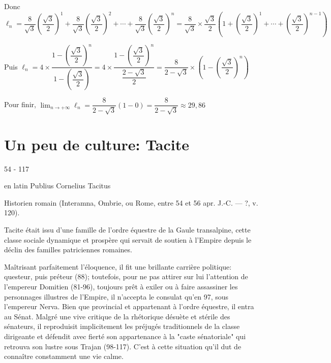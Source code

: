 \documentclass{cornouaille}
\begin{document}
\begin{exercice}
\begin{enumerate}
\begin{enumerate}
\begin{solution}
Donc $\ell_n=\dfrac{8}{\sqrt{3}} \left( \dfrac{\sqrt{3}}{2} \right)^1 + \dfrac{8}{\sqrt{3}} \left( \dfrac{\sqrt{3}}{2} \right)^2 + \cdots + \dfrac{8}{\sqrt{3}} \left( \dfrac{\sqrt{3}}{2} \right)^n
		= \dfrac{8}{\sqrt{3}} \times \dfrac{\sqrt{3}}{2} \left( 1 +  \left( \dfrac{\sqrt{3}}{2} \right)^1 + \cdots + \left( \dfrac{\sqrt{3}}{2} \right)^{n-1} \right)$\medskip 
		
Puis $\ell_n=4 \times \dfrac{1 - \left( \dfrac{\sqrt{3}}{2} \right)^{n} }{1-\left( \dfrac{\sqrt{3}}{2} \right)}
		=4 \times \dfrac{1 - \left( \dfrac{\sqrt{3}}{2} \right)^{n} }{\dfrac{2-\sqrt{3}}{2}}
		=\dfrac{8}{2-\sqrt{3}} \times \left( 1 - \left( \dfrac{\sqrt{3}}{2} \right)^{n} \right)$\medskip 
		
Pour finir, $\displaystyle\lim_{n \to + \infty} \ell_n=\dfrac{8}{2-\sqrt{3}}(1-0) =\dfrac{8}{2-\sqrt{3}} \approx 29,86$
\end{solution}
	\end{enumerate}
\end{enumerate}
\end{exercice}

\newpage
\section{Un peu de culture: Tacite}
54 - 117
 
en latin Publius Cornelius Tacitus
 
Historien romain (Interamna, Ombrie, ou Rome, entre 54 et 56 apr. J.-C. — ?, v. 120).
 
Tacite était issu d'une famille de l'ordre équestre de la Gaule transalpine, 
cette classe sociale dynamique et prospère qui servait de soutien à l'Empire depuis le déclin des familles patriciennes romaines.

 Maîtrisant parfaitement l'éloquence, 
il fit une brillante carrière politique: questeur, puis préteur (88); 
toutefois, pour ne pas attirer sur lui l'attention de l'empereur Domitien (81-96), 
toujours prêt à exiler ou à faire assassiner les personnages illustres de l'Empire, 
il n'accepta le consulat qu'en 97, sous l'empereur Nerva.
 Bien que provincial et appartenant à l'ordre équestre, 
il entra au Sénat. 
Malgré une vive critique de la rhétorique désuète et stérile des sénateurs,
 il reproduisit implicitement les préjugés traditionnels de la classe dirigeante 
et défendit avec fierté son appartenance à la "caste sénatoriale"
qui retrouva son lustre sous Trajan (98-117). 
C'est à cette situation qu'il dut de connaître constamment une vie calme.
\end{document}

